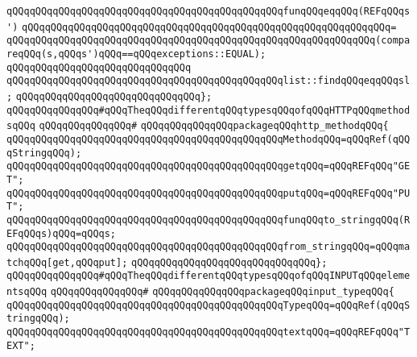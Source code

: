 \newline
\verb|qQQqqQQqqQQqqQQqqQQqqQQqqQQqqQQqqQQqqQQqqQQqqQQqfunqQQqeqqQQq(REFqQQqs')|\newline
\verb|qQQqqQQqqQQqqQQqqQQqqQQqqQQqqQQqqQQqqQQqqQQqqQQqqQQqqQQqqQQqqQQq=|\newline
\verb|qQQqqQQqqQQqqQQqqQQqqQQqqQQqqQQqqQQqqQQqqQQqqQQqqQQqqQQqqQQqqQQq(compareqQQq(s,qQQqs')qQQq==qQQqexceptions::EQUAL);|\newline
\verb|qQQqqQQqqQQqqQQqqQQqqQQqqQQqqQQq|\newline
\verb|qQQqqQQqqQQqqQQqqQQqqQQqqQQqqQQqqQQqqQQqqQQqqQQqlist::findqQQqeqqQQqsl;|\newline
\verb|qQQqqQQqqQQqqQQqqQQqqQQqqQQqqQQq};|\newline
\newline
\verb|qQQqqQQqqQQqqQQq#qQQqTheqQQqdifferentqQQqtypesqQQqofqQQqHTTPqQQqmethodsqQQq|\newline
\verb|qQQqqQQqqQQqqQQq#|\newline
\verb|qQQqqQQqqQQqqQQqpackageqQQqhttp_methodqQQq{|\newline
\newline
\verb|qQQqqQQqqQQqqQQqqQQqqQQqqQQqqQQqqQQqqQQqqQQqqQQqMethodqQQq=qQQqRef(qQQqStringqQQq);|\newline
\verb|qQQqqQQqqQQqqQQqqQQqqQQqqQQqqQQqqQQqqQQqqQQqqQQqgetqQQq=qQQqREFqQQq"GET";|\newline
\verb|qQQqqQQqqQQqqQQqqQQqqQQqqQQqqQQqqQQqqQQqqQQqqQQqputqQQq=qQQqREFqQQq"PUT";|\newline
\verb|qQQqqQQqqQQqqQQqqQQqqQQqqQQqqQQqqQQqqQQqqQQqqQQqfunqQQqto_stringqQQq(REFqQQqs)qQQq=qQQqs;|\newline
\verb|qQQqqQQqqQQqqQQqqQQqqQQqqQQqqQQqqQQqqQQqqQQqqQQqfrom_stringqQQq=qQQqmatchqQQq[get,qQQqput];|\newline
\verb|qQQqqQQqqQQqqQQqqQQqqQQqqQQqqQQq};|\newline
\newline
\verb|qQQqqQQqqQQqqQQq#qQQqTheqQQqdifferentqQQqtypesqQQqofqQQqINPUTqQQqelementsqQQq|\newline
\verb|qQQqqQQqqQQqqQQq#|\newline
\verb|qQQqqQQqqQQqqQQqpackageqQQqinput_typeqQQq{|\newline
\newline
\verb|qQQqqQQqqQQqqQQqqQQqqQQqqQQqqQQqqQQqqQQqqQQqqQQqTypeqQQq=qQQqRef(qQQqStringqQQq);|\newline
\verb|qQQqqQQqqQQqqQQqqQQqqQQqqQQqqQQqqQQqqQQqqQQqqQQqtextqQQq=qQQqREFqQQq"TEXT";|\newline
